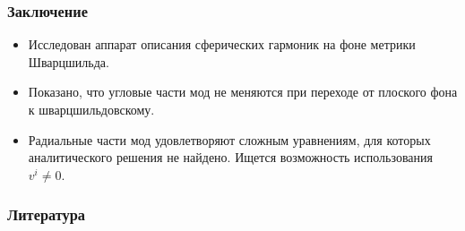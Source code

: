 \documentclass[compress]{beamer}
\def\docroot{../..}
\begin{document}
    \begin{frame}\frametitle{Заключение}

        \begin{itemize}
            \item Исследован аппарат описания сферических гармоник на фоне метрики Шварцшильда.
            \item Показано, что угловые части мод не меняются при переходе от плоского фона к шварцшильдовскому.
            \item Радиальные части мод удовлетворяют сложным уравнениям, для которых аналитического решения не найдено. Ищется возможность использования $v^i \neq 0$.
        \end{itemize}

    \end{frame}

    \begin{frame}\frametitle{Литература}

        {\tiny{
        
        
        }}

    \end{frame}
\end{document}
